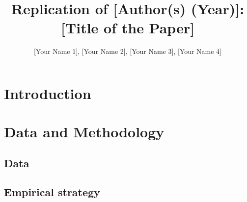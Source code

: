 \documentclass[12pt,a4paper]{article}
\title{Replication of [Author(s) (Year)]:\\{} [Title of the Paper]}
\author{[Your Name 1], [Your Name 2], [Your Name 3], [Your Name 4]}
\newif\ifshowinstr
\newcommand{\instr}[1]{\ifshowinstr{\leavevmode\color{gray}\itshape\small [#1]\par}\fi}
\begin{document}
\maketitle

\instr{The grey italic passages provide you with some short instructions. Please delete these passages before you submit by setting \texttt{\textbackslash showinstrfalse} in the preamble. \textbf{The report should be 5 to 7 pages long.} This includes tables and figures but excludes any references and Appendix A. \textbf{Appendix A} tries to guide you through some of the replication exercises. It \textbf{has to be filled in and submitted together with the report}. Appendix~B is only meant as a help for you, and you can delete it before submitting.}

\section{Introduction}

\instr{In this paragraph, you should introduce the paper and its results, as well as your evaluation and extension. Worksheet~A.1 helps you collect the key facts about the paper.}


\section{Data and Methodology}

\subsection{Data}

\instr{Worksheet~A.2 should help you understand which data you need and which adjustments you will have to make for the replication.}


\subsection{Empirical strategy}

\instr{Think about what you need to explain the identification strategy of the authors and why they believe that it is valid. Appendix~B.1 summarizes the main points for OLS, panel data and IV designs. You can use these as a reference.}
\end{document}
